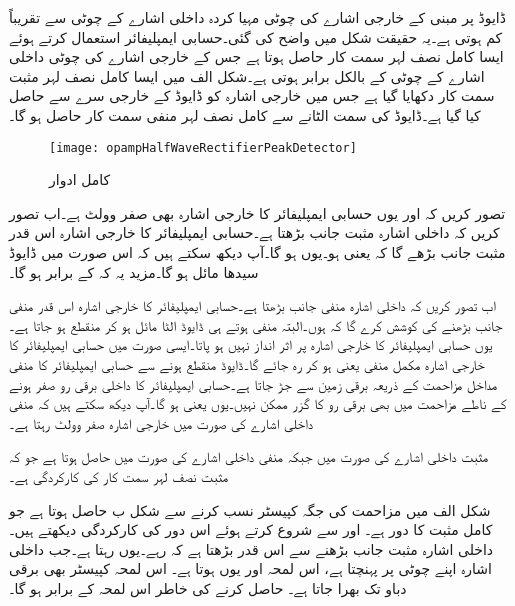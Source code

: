 ڈایوڈ پر مبنی  کے خارجی اشارے کی چوٹی مہیا کردہ داخلی اشارے کے چوٹی سے تقریباً  کم ہوتی ہے۔یہ حقیقت شکل  میں واضح کی گئی۔حسابی ایمپلیفائر استعمال کرتے ہوئے ایسا کامل نصف لہر سمت کار حاصل ہوتا ہے  جس کے خارجی اشارے کی چوٹی داخلی اشارے کے چوٹی کے بالکل برابر ہوتی ہے۔شکل الف میں ایسا کامل نصف لہر مثبت سمت کار دکھایا گیا ہے جس میں خارجی اشارہ  کو ڈایوڈ کے خارجی سرے سے حاصل کیا گیا ہے۔ڈایوڈ کی سمت الٹانے سے  کامل نصف لہر منفی سمت کار حاصل ہو گا۔
\begin{figure}
\centering
\texttt{[image: opampHalfWaveRectifierPeakDetector]}
\caption{کامل ادوار}
\label{شکل_کامل_نصف_لہر_سمت_کار}
\end{figure}

تصور کریں کہ  اور یوں حسابی ایمپلیفائر کا خارجی اشارہ  بھی صفر وولٹ ہے۔اب تصور کریں کہ داخلی اشارہ مثبت جانب بڑھتا ہے۔حسابی ایمپلیفائر کا خارجی اشارہ اس قدر مثبت جانب بڑھے گا کہ  یعنی  ہو۔یوں  ہو گا۔آپ دیکھ سکتے ہیں کہ اس صورت میں ڈایوڈ سیدھا مائل ہو گا۔مزید یہ کہ  کے برابر ہو گا۔

اب تصور کریں کہ داخلی اشارہ منفی جانب بڑھتا ہے۔حسابی ایمپلیفائر کا خارجی اشارہ  اس قدر منفی جانب بڑھنے کی کوشش کرے گا کہ  ہوں۔البتہ  منفی ہوتے ہی ڈایوڈ الٹا مائل ہو کر منقطع ہو جاتا ہے۔یوں حسابی ایمپلیفائر کا خارجی اشارہ  پر اثر انداز نہیں ہو پاتا۔ایسی صورت میں حسابی ایمپلیفائر کا خارجی اشارہ مکمل منفی یعنی  ہو کر رہ جائے گا۔ڈایوڈ منقطع ہونے سے  حسابی ایمپلیفائر کا منفی مداخل مزاحمت  کے ذریعہ برقی زمین سے جڑ جاتا ہے۔حسابی ایمپلیفائر کا داخلی برقی رو صفر ہونے کے ناطے مزاحمت میں بھی برقی رو  کا گزر ممکن نہیں۔یوں  یعنی  ہو گا۔آپ دیکھ سکتے ہیں کہ منفی داخلی اشارے کی صورت میں خارجی اشارہ صفر وولٹ رہتا ہے۔

مثبت داخلی اشارے کی صورت میں  جبکہ منفی داخلی اشارے کی صورت میں  حاصل ہوتا ہے جو کہ مثبت نصف لہر سمت کار کی کارکردگی ہے۔

شکل  الف میں مزاحمت کی جگہ کپیسٹر نسب کرنے سے شکل  ب حاصل ہوتا ہے جو کامل مثبت  کا دور ہے۔ اور  سے شروع کرتے ہوئے اس دور کی کارکردگی دیکھتے ہیں۔داخلی اشارہ مثبت جانب بڑھنے سے  اس قدر بڑھتا ہے کہ  رہے۔یوں  رہتا ہے۔جب داخلی اشارہ اپنے چوٹی  پر پہنچتا ہے، اس لمحہ  اور یوں  ہوتا ہے۔ اس لمحہ کپیسٹر بھی  برقی دباو تک بھرا جاتا ہے۔ حاصل کرنے کی خاطر اس لمحہ  کے برابر ہو گا۔

